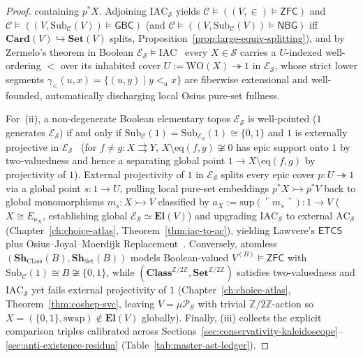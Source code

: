 \begin{proof}
containing $p^* X$. Adjoining $\mathrm{IAC}_{\mathcal{S}}$ yields $\mathcal{C} \models ((V, \in) \models \mathsf{ZFC})$ and $\mathcal{C} \models ((V, \mathrm{Sub}_{\mathcal{C}}(V)) \models \mathsf{GBC})$ (and $\mathcal{C} \models ((V, \mathrm{Sub}_{\mathcal{C}}(V)) \models \mathsf{NBG})$ iff $\mathbf{Card}(V) \hookrightarrow \mathbf{Set}(V)$ splits, Proposition~\ref{prop:large-equiv-splitting}), and by Zermelo's theorem in Boolean $\mathcal{E}_{\mathcal{S}} \models \mathrm{IAC}$~\cite[Prop.~D4.5.7]{Johnstone02} every $X \in \mathcal{S}$ carries a $U$-indexed well-ordering $<$ over its inhabited cover $U := \mathrm{WO}(X) \twoheadrightarrow 1$ in $\mathcal{E}_{\mathcal{S}}$, whose strict lower segments $\gamma_<(u, x) = \{(u, y) \mid y <_u x\}$ are fiberwise extensional and well-founded, automatically discharging local Osius pure-set fullness.

For~(ii), a non-degenerate Boolean elementary topos $\mathcal{E}_{\mathcal{S}}$ is well-pointed ($1$ generates $\mathcal{E}_{\mathcal{S}}$) if and only if $\mathrm{Sub}_{\mathcal{C}}(1) = \mathrm{Sub}_{\mathcal{E}_{\mathcal{S}}}(1) \cong \{0, 1\}$ and $1$ is externally projective in $\mathcal{E}_{\mathcal{S}}$~\cite[Prop.~VI.10.1]{MacLaneMoerdijk92} (for $f \neq g : X \rightrightarrows Y$, $X \setminus \mathrm{eq}(f, g) \not\cong 0$ has epic support onto $1$ by two-valuedness and hence a separating global point $1 \to X \setminus \mathrm{eq}(f, g)$ by projectivity of $1$). External projectivity of $1$ in $\mathcal{E}_{\mathcal{S}}$ splits every epic cover $p : U \twoheadrightarrow 1$ via a global point $s : 1 \to U$, pulling local pure-set embeddings $p^* X \rightarrowtail p^* V$ back to global monomorphisms $m_s : X \rightarrowtail V$ classified by $a_X := \mathrm{sup}(\ulcorner m_s \urcorner) : 1 \to V$ ($X \cong E_{a_X}$, establishing global $\mathcal{E}_{\mathcal{S}} \simeq \mathbf{El}(V)$) and upgrading $\mathrm{IAC}_{\mathcal{S}}$ to external $\mathrm{AC}_{\mathcal{S}}$ (Chapter~\ref{ch:choice-atlas}, Theorem~\ref{thm:iac-to-ac}), yielding Lawvere's $\mathsf{ETCS}$ plus Osius--Joyal--Moerdijk Replacement~\cite{Cole73,Mitchell72,Osius74}. Conversely, atomless $(\mathbf{Sh}_{\mathrm{Class}}(B), \mathbf{Sh}_{\mathrm{Set}}(B))$ models Boolean-valued $V^{(B)} \models \mathsf{ZFC}$ with $\mathrm{Sub}_{\mathcal{C}}(1) \cong B \not\cong \{0, 1\}$, while $(\mathbf{Class}^{\mathbb{Z}/2\mathbb{Z}}, \mathbf{Set}^{\mathbb{Z}/2\mathbb{Z}})$ satisfies two-valuedness and $\mathrm{IAC}_{\mathcal{S}}$ yet fails external projectivity of $1$ (Chapter~\ref{ch:choice-atlas}, Theorem~\ref{thm:coshep-svc}, leaving $V = \mu\mathcal{P}_{\mathcal{S}}$ with trivial $\mathbb{Z}/2\mathbb{Z}$-action so $X = (\{0, 1\}, \mathrm{swap}) \notin \mathbf{El}(V)$ globally). Finally, (iii) collects the explicit comparison triples calibrated across Sections~\ref{sec:conservativity-kaleidoscope}--\ref{sec:anti-existence-residua} (Table~\ref{tab:master-ast-ledger}).
\end{proof}


